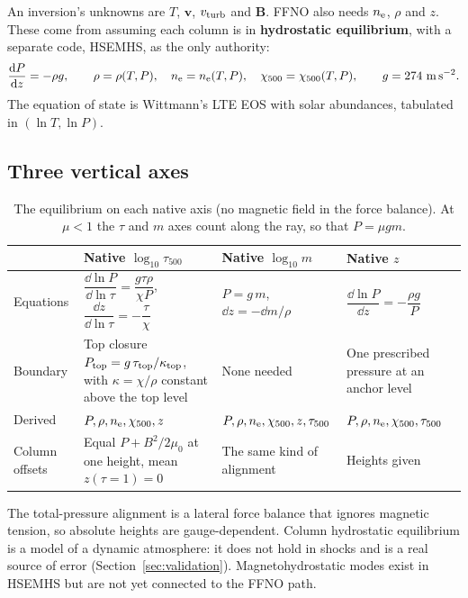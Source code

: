 An inversion's unknowns are $T$, $\mathbf v$, $v_{\rm turb}$ and $\mathbf B$. FFNO also needs $n_{\rm e}$, $\rho$ and $z$. These come from assuming each column is in \textbf{hydrostatic equilibrium}, with a separate code, HSEMHS, as the only authority:
\begin{equation}
\frac{\dd P}{\dd z}=-\rho g,\qquad \rho=\rho(T,P),\quad \nel=\nel(T,P),\quad\chi_{500}=\chi_{500}(T,P),\qquad g=274\ \mathrm{m\,s^{-2}}.
\end{equation}
The equation of state is Wittmann's LTE EOS with solar abundances, tabulated in $(\ln T,\ln P)$.

\subsection{Three vertical axes}
\begin{table}[H]\centering\small
\begin{tabularx}{\linewidth}{lYYY}
\toprule
&Native $\log_{10}\tau_{500}$&Native $\log_{10}m$&Native $z$\\\midrule
Equations&$\dfrac{\dd\ln P}{\dd\ln\tau}=\dfrac{g\tau\rho}{\chi P}$,\quad $\dfrac{\dd z}{\dd\ln\tau}=-\dfrac{\tau}{\chi}$&$P=g\,m$,\quad $\dd z=-\dd m/\rho$&$\dfrac{\dd\ln P}{\dd z}=-\dfrac{\rho g}{P}$\\[3mm]
Boundary&Top closure $P_{\rm top}=g\,\tau_{\rm top}/\kappa_{\rm top}$, with $\kappa=\chi/\rho$ constant above the top level&None needed&One prescribed pressure at an anchor level\\
Derived&$P,\rho,n_{\rm e},\chi_{500},z$&$P,\rho,n_{\rm e},\chi_{500},z,\tau_{500}$&$P,\rho,n_{\rm e},\chi_{500},\tau_{500}$\\
Column offsets&Equal $P+B^2/2\mu_0$ at one height, mean $z(\tau=1)=0$&The same kind of alignment&Heights given\\
\bottomrule
\end{tabularx}
\caption{The equilibrium on each native axis (no magnetic field in the force balance). At $\mu<1$ the $\tau$ and $m$ axes count along the ray, so that $P=\mu g m$.}
\end{table}

The total-pressure alignment is a lateral force balance that ignores magnetic tension, so absolute heights are gauge-dependent. Column hydrostatic equilibrium is a model of a dynamic atmosphere: it does not hold in shocks and is a real source of error (Section~\ref{sec:validation}). Magnetohydrostatic modes exist in HSEMHS but are not yet connected to the FFNO path.

